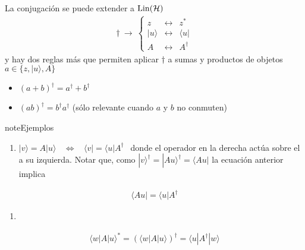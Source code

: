 \documentclass[letterpaper,10pt,english]{jupyterBook}
\newcommand{\bra}[1]{\langle #1|}
\newcommand{\ket}[1]{|#1\rangle}
\newcommand{\Hil}{{\cal H}}
\begin{document}
\sphinxAtStartPar
La conjugación  se puede extender a \({\rm Lin}(\Hil)\)
\begin{equation*}
\begin{split}
\dagger ~\to ~
\left\{
\begin{matrix}
z & \leftrightarrow  &  z^* \\
|u\rangle & \leftrightarrow &   \langle u | \\
A & \leftrightarrow & A^{\dagger}
\end{matrix}
\right.
\end{split}
\end{equation*}
\sphinxAtStartPar
y hay dos reglas más que permiten aplicar \(\dagger\) a sumas y productos de  objetos  \(a \in\{z,\ket{u},A\}\)
\begin{itemize}
\item {} 
\sphinxAtStartPar
{} \(( a + b)^\dagger = a^\dagger + b^\dagger \)

\item {} 
\sphinxAtStartPar
{} \((ab)^\dagger = b^\dagger a^\dagger\) (sólo relevante cuando \(a\) y \(b\) no conmuten)

\end{itemize}

\begin{sphinxadmonition}{note}{Ejemplos}
\begin{enumerate}
%
\item {} 
\sphinxAtStartPar
\(\ket{v} = A\ket{u} ~~~~\Leftrightarrow ~~~~\bra{v} = \bra{u}A^\dagger
~~\) donde el operador en la derecha actúa sobre el  a su izquierda. Notar que, como \(\ket{v}^\dagger=\ket{Au}^\dagger = \bra{Au}\) la ecuación anterior implica

\end{enumerate}
\begin{equation*}
\begin{split}
\bra{Au} = \bra{u} A^\dagger
\end{split}
\end{equation*}\begin{enumerate}
%
\setcounter{enumi}{1}
\item {} 
\end{enumerate}
\begin{equation*}
\begin{split}
\bra{w}A\ket{u}^* = (\bra{w}A\ket{u})^\dagger = \bra{u}A^\dagger\ket{w}
\end{split}
\end{equation*}\end{sphinxadmonition}
\end{document}
